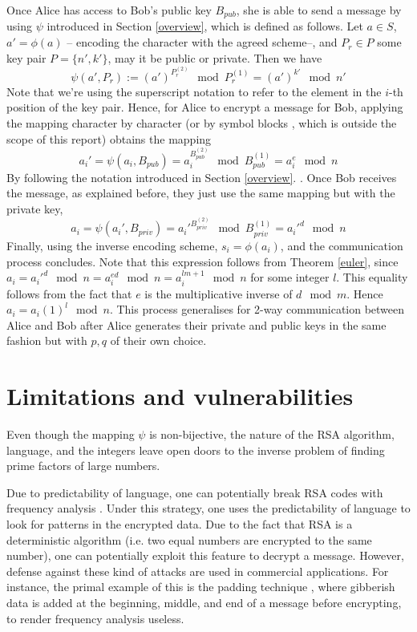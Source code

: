 \documentclass[11pt]{scrartcl}
\begin{document}
Once Alice has access to Bob's public key $B_{pub}$, she is able to send a message by
using $\psi$ introduced in Section \ref{overview}, which is defined as follows. Let $a\in
S$, $a' = \phi(a)$ -- encoding the character with the agreed scheme--, and $P_{r}\in P$ some
key pair $P=\{n',k'\}$, may it be public or private. Then we have
\[\psi (a', P_{r}) := (a')^{P_{r}^{(2)}}\mod P_{r}^{(1)} = (a')^{k'}\mod n'\]
Note that we're using the superscript notation to refer to the element in the $i$-th
position of the key pair. Hence, for Alice to encrypt a message for Bob, applying the
mapping character by character (or by symbol blocks \cite{paddingCrypto}, which is
outside the scope of this report) obtains the mapping 
\[a_i' = \psi(a_i, B_{pub}) = a_i^{B_{pub}^{(2)}}\mod B_{pub}^{(1)} = a_i^e \mod n\]
By following the notation introduced in Section \ref{overview}. . Once Bob receives the
message, as explained before, they just use the same mapping but with the private key,
\[a_i = \psi(a_i', B_{priv}) = a_i'^{B_{priv}^{(2)}}\mod B_{priv}^{(1)} = a_i'^d \mod n\]
Finally, using the inverse encoding scheme, $s_i=\phi (a_i)$, and the communication
process concludes. Note that this expression follows from Theorem \ref{euler}, since $a_i=
a_i'^d\mod n = a_i^{ed}\mod n = a_i^{lm + 1}\mod n$ for some integer $l$. This equality
follows from the fact that $e$ is the multiplicative inverse of $d\mod m$. Hence $a_i=
a_i (1)^l\mod n$. This process generalises for 2-way communication between Alice and Bob
after Alice generates their private and public keys in the same fashion but with $p,q$ of
their own choice.

\section{Limitations and vulnerabilities}\label{limitations}
Even though the mapping $\psi$ is non-bijective, the nature of the RSA algorithm,
language, and the integers leave open doors to the inverse problem of finding prime
factors of large numbers.


Due to predictability of language, one can potentially break RSA codes with frequency
analysis \cite{cypherTextAttack}. Under this strategy, one uses the predictability of
language to look for patterns in the encrypted data. Due to the fact that RSA is a
deterministic algorithm (i.e. two equal numbers are encrypted to the same number), one can
potentially exploit this feature to decrypt a message. However, defense against these kind
of attacks are used in commercial applications. For instance, the primal example of this
is the padding technique \cite{paddingCrypto}, where gibberish data is added at the
beginning, middle, and end of a message before encrypting, to render frequency analysis
useless.
\end{document}
